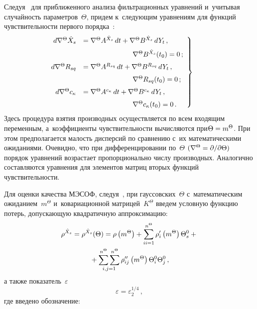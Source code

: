 \begin{multicols}{2}
Следуя~\cite{5-s} для приближенного анализа фильт\-ра\-ционных уравнений и~учитывая 
случайность параметров~$\Theta$, придем к~следующим уравнениям для функций 
чувствительности первого порядка~\cite{3-s}:
\begin{equation}
\left.
\begin{array}{rl}
\hspace*{-15mm}d\nabla^\Theta \hat X_s &= \nabla^\Theta A^{\hat X_s}\, dt + 
\nabla^\Theta B^{\hat X_s}\,dY_t\,,\\[6pt] 
&\hspace*{25mm}\nabla^\Theta B^{\hat X_s}(t_0) =0\,; \\[6pt]
\hspace*{-15mm}d\nabla^\Theta R_{sq} &= \nabla^\Theta A^{R_{sq}} \,dt + 
\nabla^\Theta B^{R_{sq}}\,dY_t\,, \\[6pt] 
&\hspace*{25mm}\nabla^\Theta R_{sq}(t_0) =0\,;\\[6pt]
\hspace*{-15mm}d\nabla^\Theta c_{\kappa} &= \nabla^\Theta A^{c_\kappa}\, dt + 
\nabla^\Theta B^{c_\kappa}\,dY_t\,,\\[6pt]
& \hspace*{25mm}\nabla^\Theta c_\kappa(t_0) =0\,.
    \end{array}
    \right\}\hspace*{-3mm}
    \label{e3.22-s}
    \end{equation}
Здесь процедура взятия производных осуществляется по всем входящим 
переменным, а~коэффициенты чувствительности вычисляются при\linebreak  $\Theta\hm=m^\Theta$. 
При этом предполагается малость дис\-пер\-сий по сравнению с~их математическими 
ожиданиями. Очевидно, что при дифференцировании по~$\Theta$ 
$(\nabla^\Theta \hm= \prt /\prt\Theta)$
порядок уравнений возрастает пропорционально числу производных. Аналогично 
составляются уравнения для элементов матриц вторых функций чувствительности.

Для оценки качества МЭСОФ, следуя~\cite{5-s}, при гауссовских~$\Theta$ 
с~математическим ожиданием~$m^\Theta$ и~ковариационной матрицей~$K^\Theta$ 
введем условную функцию потерь, допускающую квадратичную аппроксимацию:
\begin{multline}
\rho^{\hat X_s}=\rho^{\hat X_s}(\Theta) =
\rho \left(m^\Theta\right) +\sss_{ii=1}^{n^\Theta} \rho_i' 
\left(m^\Theta\right)\Theta_s^0+ {}\\
{}+\ss2\limits_{i,j=1} \rho_{ij}'' 
\left(m^\Theta\right)\Theta_i^0 \Theta_j^0\,,
\label{e3.23-s}
\end{multline}
а также показатель~$\varepsilon$
    \begin{equation}
    \varepsilon =\varepsilon_2^{1/4}\,,\label{e3.24-s}
    \end{equation}
где введено обозначение:


\end{multicols}

